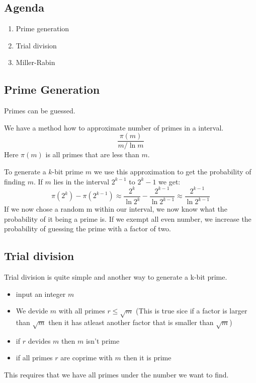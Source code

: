 

\subsection*{Agenda}
\begin{enumerate}
\item Prime generation
\item Trial division
\item Miller-Rabin
\end{enumerate}

\subsection{Prime Generation}
Primes can be guessed.

We have a method how to approximate number of primes in a interval.
\[ \frac{\pi (m)}{m/\ln m} \]
Here $\pi (m)$ is all primes that are less than $m$.

To generate a $k$-bit prime $m$ we use this approximation to get the
probability of finding $m$. If $m$ lies in the interval $2^{k-1}$ to
$2^k-1$ we get:
\[
\pi (2^k)-\pi (2^{k-1}) \approx
\frac{2^k}{\ln 2^k}-\frac{2^{k-1}}{\ln 2^{k-1}}
\approx \frac{2^{k-1}}{\ln 2^{k-1}}
\]
If we now chose a random m within our interval, we now know what the
probability of it being a prime is. If we exempt all even number, we
increase the probability of guessing the prime with a factor of two.

\subsection{Trial division}
Trial division is quite simple and another way to generate a k-bit prime.
\begin{itemize}
\item input an integer $m$
\item We devide $m$ with all primes $r\le \sqrt{m}$ (This is true sice if a factor is larger than $\sqrt{m}$ then it has atleast another factor that is smaller than $\sqrt{m}$)
\item if $r$ devides $m$ then $m$ isn't prime
\item if all primes $r$ are coprime with $m$ then it is prime
\end{itemize}
This requires that we have all primes under the number we want to find.

